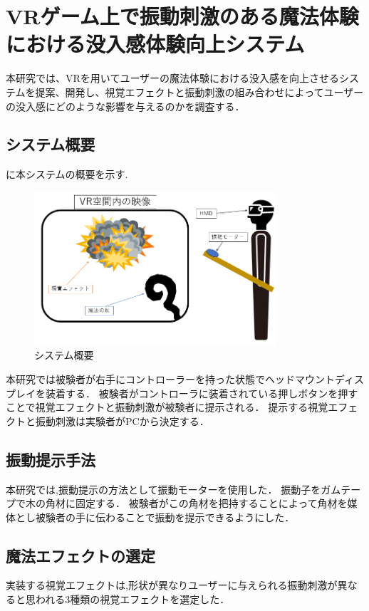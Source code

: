 \chapter{VRゲーム上で振動刺激のある魔法体験における没入感体験向上システム}
本研究では、VRを用いてユーザーの魔法体験における没入感を向上させるシステムを提案、開発し、視覚エフェクトと振動刺激の組み合わせによってユーザーの没入感にどのような影響を与えるのかを調査する．






\section{システム概要}
に本システムの概要を示す.
\begin{figure}[h]
\centering
\includegraphics[clip,width=9cm]{./fig/allsystem.png}
\caption{システム概要}\label{allsystem}
\end{figure}

本研究では被験者が右手にコントローラーを持った状態でヘッドマウントディスプレイを装着する．
被験者がコントローラに装着されている押しボタンを押すことで視覚エフェクトと振動刺激が被験者に提示される．
提示する視覚エフェクトと振動刺激は実験者がPCから決定する．

\section{振動提示手法}
本研究では,振動提示の方法として振動モーターを使用した．
振動子をガムテープで木の角材に固定する．
被験者がこの角材を把持することによって角材を媒体とし被験者の手に伝わることで振動を提示できるようにした．


\newpage

\section{魔法エフェクトの選定}
実装する視覚エフェクトは,形状が異なりユーザーに与えられる振動刺激が異なると思われる3種類の視覚エフェクトを選定した．

